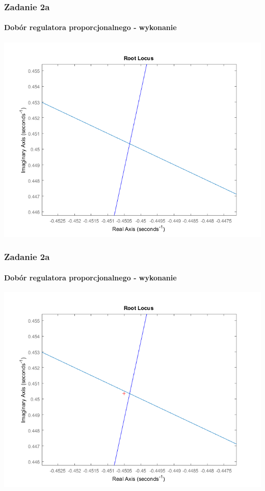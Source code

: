 \documentclass{beamer}
\begin{document}
\begin{frame}\frametitle{Zadanie 2a}\framesubtitle{Dobór regulatora proporcjonalnego - wykonanie}
\centering	\includegraphics[scale=0.5]{a-przyblizenie.png}
\end{frame}

\begin{frame}\frametitle{Zadanie 2a}\framesubtitle{Dobór regulatora proporcjonalnego - wykonanie}
\centering	\includegraphics[scale=0.5]{a-rlocfind.png}
\end{frame}
\end{document}
